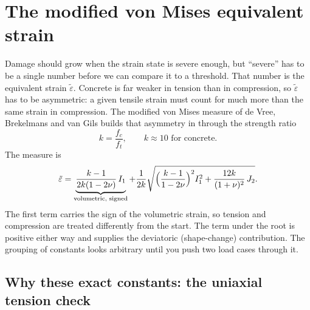 \documentclass[11pt]{article}
\newcommand{\eqs}{\tilde{\varepsilon}}
\begin{document}
\section{The modified von Mises equivalent strain}
\label{sec:eqstrain}

Damage should grow when the strain state is severe enough, but ``severe'' has to be a
single number before we can compare it to a threshold. That number is the equivalent
strain $\eqs$. Concrete is far weaker in tension than in compression, so $\eqs$ has to be
asymmetric: a given tensile strain must count for much more than the same strain in
compression. The modified von Mises measure of de Vree, Brekelmans and van Gils builds that
asymmetry in through the strength ratio
%
\begin{equation}
k = \frac{f_c}{f_t}, \qquad k \approx 10 \text{ for concrete}.
\end{equation}
%
The measure is
%
\begin{equation}
\eqs
= \underbrace{\frac{k-1}{2k(1-2\nu)}\,I_1}_{\text{volumetric, signed}}
+ \frac{1}{2k}\sqrt{\Bigl(\frac{k-1}{1-2\nu}\Bigr)^{2} I_1^{2}
        + \frac{12k}{(1+\nu)^{2}}\,J_2}.
\label{eq:eqstrain}
\end{equation}
%
The first term carries the sign of the volumetric strain, so tension and compression are
treated differently from the start. The term under the root is positive either way and
supplies the deviatoric (shape-change) contribution. The grouping of constants looks
arbitrary until you push two load cases through it.

\subsection{Why these exact constants: the uniaxial tension check}
\end{document}
